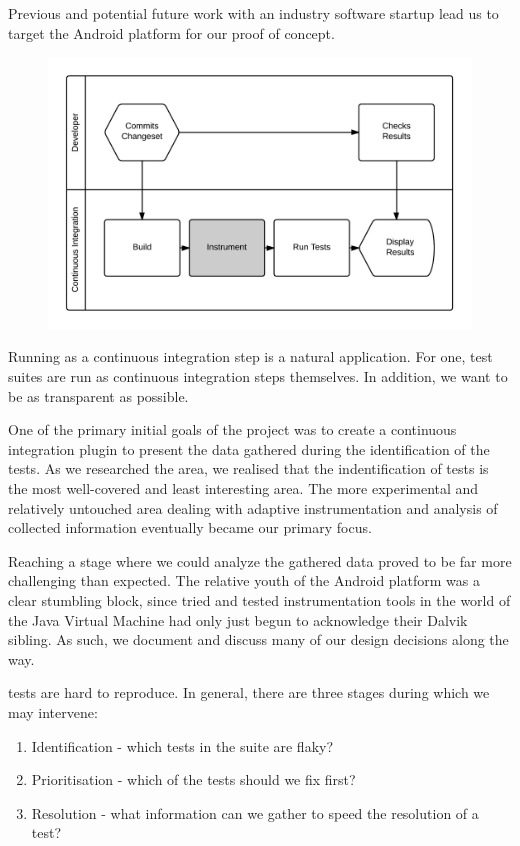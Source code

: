 Previous and potential future work with an industry software startup lead us to
target the Android platform for our proof of concept.

\begin{figure}[h]

\includegraphics[width=\linewidth]{Images/developer_workflow}

\caption{}
\label{fig:developer_workflow}
\end{figure}

Running as a continuous integration step is a natural application. For one, test
suites are run as continuous integration steps themselves. In addition, we want
to be as transparent as possible.

One of the primary initial goals of the project was to create a continuous
integration plugin to present the data gathered during the identification of the
\flaky tests. As we researched the area, we realised that the indentification of
\flaky tests is the most well-covered and least interesting area. The more
experimental and relatively untouched area dealing with adaptive instrumentation
and analysis of collected information eventually became our primary focus.

Reaching a stage where we could analyze the gathered data proved to be far more
challenging than expected. The relative youth of the Android platform was a
clear stumbling block, since tried and tested instrumentation tools in the world
of the Java Virtual Machine had only just begun to acknowledge their Dalvik
sibling. As such, we document and discuss many of our design decisions along the
way.

\Flaky tests are hard to reproduce. In general, there are three stages during
which we may intervene:
\begin{enumerate}
	\item Identification - which tests in the suite are flaky?
	\item Prioritisation - which of the \flaky tests should we fix first?
	\item Resolution - what information can we gather to speed the resolution of a test?
\end{enumerate}

